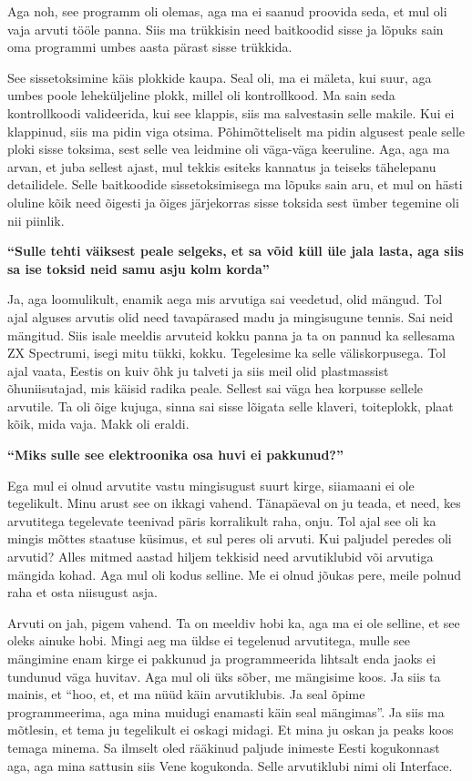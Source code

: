 Aga noh, see programm oli olemas, aga ma ei saanud proovida seda, et mul oli 
vaja arvuti tööle panna. Siis ma trükkisin need baitkoodid sisse ja  lõpuks 
sain oma programmi umbes aasta pärast sisse trükkida.

See sissetoksimine käis plokkide kaupa. Seal oli, ma ei mäleta, kui suur, aga 
umbes poole leheküljeline plokk, millel oli kontrollkood. Ma sain seda 
kontrollkoodi valideerida, kui see klappis, siis ma salvestasin selle makile. 
Kui ei klappinud, siis ma pidin viga otsima. Põhimõtteliselt ma pidin algusest 
peale selle ploki sisse toksima, sest selle vea leidmine oli väga-väga 
keeruline. Aga, aga ma arvan, et juba sellest ajast, mul tekkis esiteks 
kannatus ja teiseks tähelepanu detailidele. Selle baitkoodide sissetoksimisega 
ma lõpuks sain aru, et mul on hästi oluline kõik need õigesti ja õiges 
järjekorras sisse toksida sest ümber tegemine oli nii piinlik.


\textbf{\enquote{Sulle tehti väiksest peale selgeks, et sa võid küll üle jala 
lasta, aga siis sa ise toksid neid samu asju kolm korda}}

Ja, aga loomulikult, enamik aega mis arvutiga sai veedetud, olid  mängud. Tol 
ajal alguses arvutis olid need tavapärased madu ja mingisugune tennis. Sai neid 
mängitud. Siis isale meeldis arvuteid kokku panna ja ta on pannud ka sellesama 
ZX Spectrumi, isegi mitu tükki, kokku. Tegelesime ka 
selle väliskorpusega. Tol ajal vaata, Eestis on kuiv õhk ju talveti ja siis 
meil olid plastmassist õhuniisutajad, mis käisid radika peale. Sellest sai väga 
hea korpusse sellele arvutile. Ta oli õige kujuga, sinna sai sisse lõigata 
selle klaveri, toiteplokk, plaat kõik, mida vaja. Makk oli eraldi.

\textbf{\enquote{Miks sulle see elektroonika osa huvi ei pakkunud?}}

Ega mul ei olnud arvutite vastu mingisugust suurt kirge, siiamaani ei ole
tegelikult. Minu arust see on ikkagi vahend. Tänapäeval on ju
teada, et need, kes arvutitega tegelevate teenivad päris korralikult raha,
onju. Tol ajal see oli ka mingis mõttes staatuse küsimus, et sul peres oli
arvuti. Kui paljudel peredes
oli arvutid? Alles mitmed aastad hiljem tekkisid  need arvutiklubid või
arvutiga  mängida kohad. Aga mul oli kodus selline. Me ei olnud
jõukas pere, meile polnud raha et osta niisugust asja. 

Arvuti on jah, pigem vahend. Ta on meeldiv hobi ka, aga ma ei ole selline, et
see oleks ainuke hobi. Mingi aeg ma üldse ei tegelenud arvutitega, mulle see
mängimine enam kirge ei pakkunud ja programmeerida lihtsalt enda jaoks ei
tundunud väga huvitav. Aga mul oli üks sõber, me mängisime koos. Ja siis ta
mainis, et \enquote{hoo, et, et ma nüüd käin arvutiklubis. Ja seal õpime programmeerima,
aga mina muidugi enamasti käin seal mängimas}. Ja siis ma mõtlesin, et tema ju
tegelikult ei oskagi midagi. Et mina ju oskan ja peaks koos temaga minema. Sa
ilmselt oled rääkinud paljude inimeste Eesti kogukonnast aga, aga mina sattusin
siis Vene kogukonda. Selle arvutiklubi nimi oli Interface.

